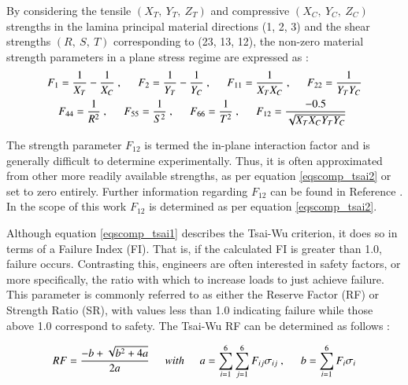 By considering the tensile $(X_T,\ Y_T,\ Z_T)$ and compressive $(X_C,\ Y_C,\ Z_C)$ strengths in the lamina principal material directions (1, 2, 3) and the shear strengths $(R,\ S,\ T)$ corresponding to (23, 13, 12), the non-zero material strength parameters in a plane stress regime are expressed as \cite{reddy2004mechanics}:
\begin{gather} 
	\begin{aligned}
		&F_1 = \frac{1}{X_T} - \frac{1}{X_C}\ ,
		\hspace{5mm}
		F_2 = \frac{1}{Y_T} - \frac{1}{Y_C}\ ,
		\hspace{5mm}
		F_{11} = \frac{1}{X_TX_C}\ ,
		\hspace{5mm}
		F_{22} = \frac{1}{Y_TY_C}
		\\
		&\ \ \ \ 
		F_{44} = \frac{1}{R^2}\ ,
		\hspace{5mm}
		F_{55} = \frac{1}{S^2}\ ,
		\hspace{5mm}
		F_{66} = \frac{1}{T^2}\ ,
		\hspace{5mm}
		F_{12} = \frac{-0.5}{\sqrt{X_TX_CY_TY_C}}
		\label{eqscomp_tsai2}
	\end{aligned}
\end{gather}

The strength parameter $F_{12}$ is termed the in-plane interaction factor and is generally difficult to determine experimentally. Thus, it is often approximated from other more readily available strengths, as per equation \ref{eqscomp_tsai2} or set to zero entirely. Further information regarding $F_{12}$ can be found in Reference \cite{tsai12}. In the scope of this work $F_{12}$ is determined as per equation \ref{eqscomp_tsai2}.

Although equation \ref{eqscomp_tsai1} describes the Tsai-Wu criterion, it does so in terms of a Failure Index (FI). That is, if the calculated FI is greater than 1.0, failure occurs. Contrasting this, engineers are often interested in safety factors, or more specifically, the ratio with which to increase loads to just achieve failure. This parameter is commonly referred to as either the Reserve Factor (RF) or Strength Ratio (SR), with values less than 1.0 indicating failure while those above 1.0 correspond to safety. The Tsai-Wu RF can be determined as follows \cite{kolios2012evaluation}:

\begin{equation} 
RF = \frac{-b + \sqrt{b^2 + 4a}}{2a}
\hspace{5mm}with\hspace{5mm}
a = \sum_{i=1}^{6} \sum_{j=1}^{6} F_{ij} \sigma_{ij}\ ,
\hspace{5mm}
b = \sum_{i=1}^{6} F_i \sigma_i 
\label{eqscomp_stress_recovery3}
\end{equation}
